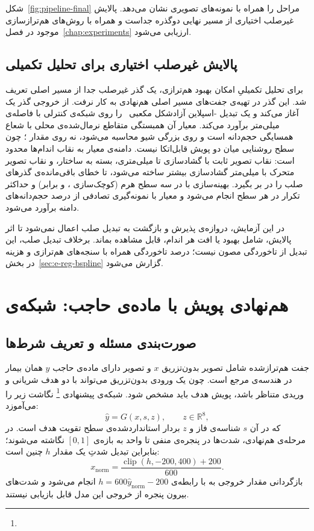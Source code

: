 شکل~\ref{fig:pipeline-final} مراحل را همراه با نمونه‌های تصویری نشان می‌دهد. پالایش غیرصلب اختیاری از مسیر نهایی دوگذره جداست و همراه با روش‌های هم‌ترازسازی موجود در فصل~\ref{chap:experiments} ارزیابی می‌شود.


\subsection{پالایش غیرصلب اختیاری برای تحلیل تکمیلی}
\label{sec:m-reg-optional}

برای تحلیل تکمیلیِ امکان بهبود هم‌ترازی، یک گذر غیرصلب جدا از مسیر اصلی تعریف شد. این گذر در تهیه‌ی جفت‌های مسیر اصلی هم‌نهادی به کار نرفت. از خروجی گذر یک آغاز می‌کند و یک تبدیل -اسپلاین آزادشکل مکعبی~\cite{rueckert1999} را روی شبکه‌ی کنترلی با فاصله‌ی  میلی‌متر برآورد می‌کند. معیار آن همبستگی متقاطع نرمال‌شده‌ی محلی با شعاع همسایگی  حجم‌دانه است و روی بزرگی شیو محاسبه می‌شود، نه روی مقدار ؛ چون سطح روشنایی میان دو پویش قابل‌اتکا نیست. دامنه‌ی معیار به نقاب اندام‌ها محدود است: نقاب تصویر ثابت با گشادسازی  تا  میلی‌متری، بسته به ساختار، و نقاب تصویر متحرک با  میلی‌متر گشادسازی بیشتر ساخته می‌شود، تا خطای باقی‌مانده‌ی گذرهای صلب را در بر بگیرد. بهینه‌سازی با  در سه سطح هرم (کوچک‌سازی ،  و  برابر) و حداکثر  تکرار در هر سطح انجام می‌شود و معیار با نمونه‌گیری تصادفی از  درصد حجم‌دانه‌های دامنه برآورد می‌شود.

در این آزمایش، دروازه‌ی پذیرش و بازگشت به تبدیل صلب اعمال نمی‌شود تا اثر پالایش، شامل بهبود یا افت هر اندام، قابل مشاهده بماند. برخلاف تبدیل صلب، این تبدیل از تاخوردگی مصون نیست؛ درصد تاخوردگی همراه با سنجه‌های هم‌ترازی و هزینه در بخش~\ref{sec:e-reg-bspline} گزارش می‌شود.

\section{هم‌نهادی پویش با ماده‌ی حاجب: شبکه‌ی }
\label{sec:m-syn}

\subsection{صورت‌بندی مسئله و تعریف شرط‌ها}
\label{sec:m-syn-formulation}

جفت هم‌ترازشده شامل تصویر بدون‌تزریق $x$ و تصویر دارای ماده‌ی حاجب $y$ همان بیمار در هندسه‌ی مرجع است. چون یک ورودی بدون‌تزریق می‌تواند با دو هدف شریانی و وریدی متناظر باشد، پویش هدف باید مشخص شود. شبکه‌ی پیشنهادی \footnote{} نگاشت زیر را می‌آموزد:
\begin{equation}
\hat y=G(x,s,z),\qquad z\in\mathbb R^8,
\label{eq:m-synthesis-map}
\end{equation}
که در آن $s$ شناسه‌ی فاز و $z$ بردار استانداردشده‌ی سطح تقویت هدف است. در مرحله‌ی هم‌نهادی، شدت‌ها در پنجره‌ی منفی  تا  واحد  به بازه‌ی $[0,1]$ نگاشته می‌شوند؛ بنابراین تبدیل شدتِ یک مقدار $h$ چنین است:
\[
x_{\mathrm{norm}}=\frac{\operatorname{clip}(h,-200,400)+200}{600}.
\]
بازگردانی مقدار خروجی به  با رابطه‌ی $h=600\hat y_{\mathrm{norm}}-200$ انجام می‌شود و شدت‌های بیرون پنجره از خروجی این مدل قابل بازیابی نیستند.

